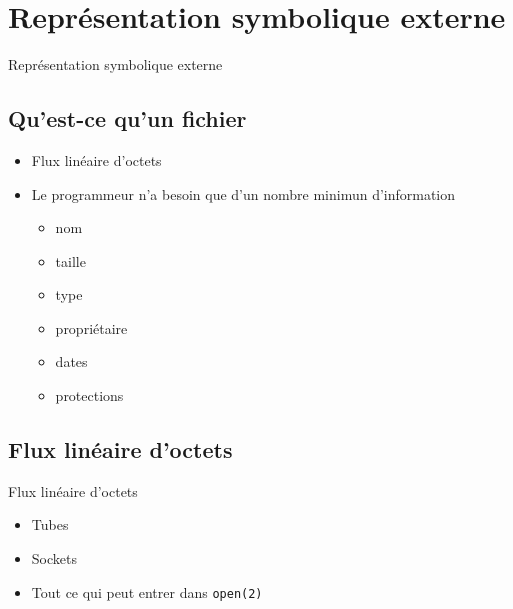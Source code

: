 \def\sectitle{Représentation symbolique externe}
\section{\sectitle}
\begin{frame}{\sectitle}
\begin{block}{\subsectitle}
\def\subsectitle{Qu'est-ce qu'un fichier}
\subsection{\subsectitle}
\begin{itemize}
    \item Flux linéaire d'octets
    \item Le programmeur n'a besoin que d'un nombre minimun d'information
    \begin{itemize}
        \item nom
        \item taille
        \item type
        \item propriétaire
        \item dates
        \item protections
    \end{itemize}
\end{itemize}
\end{block}

\def\subsectitle{Flux linéaire d'octets}
\subsection{\subsectitle}
\begin{exampleblock}{\subsectitle}
\begin{itemize}
    \item Tubes
    \item Sockets
    \item Tout ce qui peut entrer dans \texttt{open(2)}
\end{itemize}
\end{exampleblock}
\end{frame}


